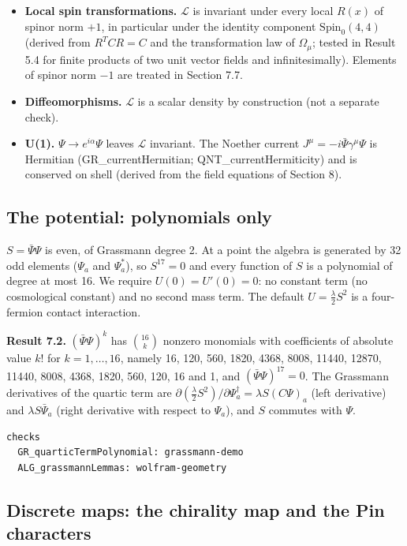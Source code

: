 \documentclass[11pt]{article}
\begin{document}
\begin{itemize}
\item \textbf{Local spin transformations.} $\mathcal L$ is invariant under every local $R(x)$ of spinor norm $+1$, in particular under the identity component $\mathrm{Spin}_0(4,4)$ (derived from $R^TCR=C$ and the transformation law of $\Omega_\mu$; tested in Result 5.4 for finite products of two unit vector fields and infinitesimally). Elements of spinor norm $-1$ are treated in Section 7.7.
\item \textbf{Diffeomorphisms.} $\mathcal L$ is a scalar density by construction (not a separate check).
\item \textbf{U(1).} $\Psi\to e^{i\alpha}\Psi$ leaves $\mathcal L$ invariant. The Noether current $J^\mu=-i\bar\Psi\gamma^\mu\Psi$ is Hermitian (GR\_currentHermitian; QNT\_currentHermiticity) and is conserved on shell (derived from the field equations of Section 8).
\end{itemize}

\subsection{The potential: polynomials only}

$S=\bar\Psi\Psi$ is even, of Grassmann degree 2. At a point the algebra is generated by 32 odd elements ($\Psi_a$ and $\Psi_a^\ast$), so $S^{17}=0$ and every function of $S$ is a polynomial of degree at most 16. We require $U(0)=U'(0)=0$: no constant term (no cosmological constant) and no second mass term. The default $U=\tfrac\lambda2S^2$ is a four-fermion contact interaction.

\textbf{Result 7.2.} $(\bar\Psi\Psi)^k$ has $\binom{16}{k}$ nonzero monomials with coefficients of absolute value $k!$ for $k=1,\dots,16$, namely 16, 120, 560, 1820, 4368, 8008, 11440, 12870, 11440, 8008, 4368, 1820, 560, 120, 16 and 1, and $(\bar\Psi\Psi)^{17}=0$. The Grassmann derivatives of the quartic term are $\partial(\tfrac\lambda2S^2)/\partial\Psi^\dagger_a=\lambda S(C\Psi)_a$ (left derivative) and $\lambda S\bar\Psi_a$ (right derivative with respect to $\Psi_a$), and $S$ commutes with $\Psi$.

\begin{Verbatim}[fontsize=\small]
checks
  GR_quarticTermPolynomial: grassmann-demo
  ALG_grassmannLemmas: wolfram-geometry
\end{Verbatim}

\subsection{Discrete maps: the chirality map and the Pin characters}
\end{document}
